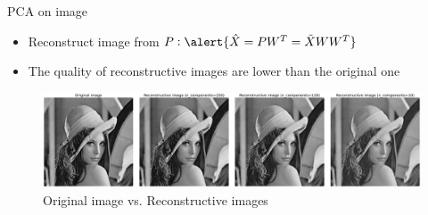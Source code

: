 \begin{frame}{PCA on image}
    \begin{itemize}
        \item Reconstruct image from $P: \alert{\hat{X} = PW^T = \tilde{X}WW^T}$
        \item The quality of reconstructive images are lower than the original one
    \end{itemize}
    \begin{figure}
        \centering
        \includegraphics[width=\linewidth]{img/lena_compress1.pdf}
        \caption{Original image vs. Reconstructive images}
    \end{figure}
\end{frame}

